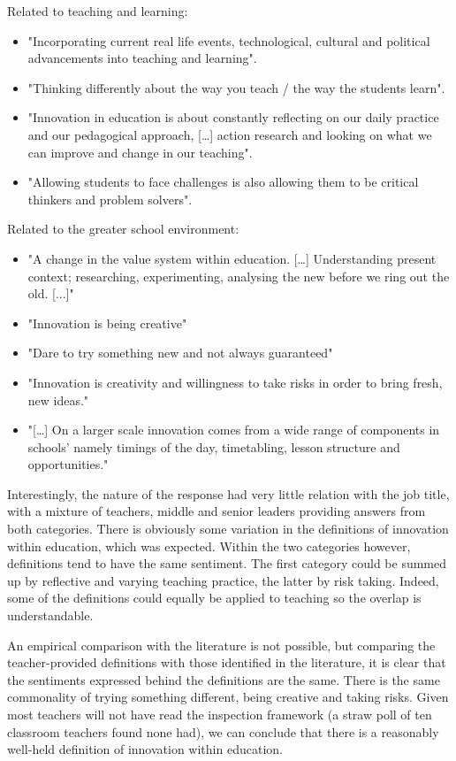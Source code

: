 Related to teaching and learning: 

\begin{itemize}
\item "Incorporating current real life events, technological, cultural and political advancements into teaching and learning".
\item "Thinking differently about the way you teach / the way the students learn".
\item "Innovation in education is about constantly reflecting on our daily practice and our pedagogical approach, […] action research and looking on what we can improve and change in our teaching".
\item "Allowing students to face challenges is also allowing them to be critical thinkers and problem solvers".
\end{itemize}

Related to the greater school environment:
\begin{itemize}
\item "A change in the value system within education. […] Understanding present context; researching, experimenting, analysing the new before we ring out the old. [...]"
\item "Innovation is being creative"
\item "Dare to try something new and not always guaranteed"
\item "Innovation is creativity and willingness to take risks in order to bring fresh, new ideas."
\item "[…] On a larger scale innovation comes from a wide range of components in schools' namely timings of the day, timetabling, lesson structure and opportunities."
\end{itemize}

Interestingly, the nature of the response had very little relation with the job title, with a mixture of teachers, middle and senior leaders providing answers from both categories. There is obviously some variation in the definitions of innovation within education, which was expected. Within the two categories however, definitions tend to have the same sentiment. The first category could be summed up by reflective and varying teaching practice, the latter by risk taking. Indeed, some of the definitions could equally be applied to teaching so the overlap is understandable.

An empirical comparison with the literature is not possible, but comparing the teacher-provided definitions with those identified in the literature, it is clear that the sentiments expressed behind the definitions are the same. There is the same commonality of trying something different, being creative and taking risks. Given most teachers will not have read the inspection framework (a straw poll of ten classroom teachers found none had), we can conclude that there is a reasonably well-held definition of innovation within education.

